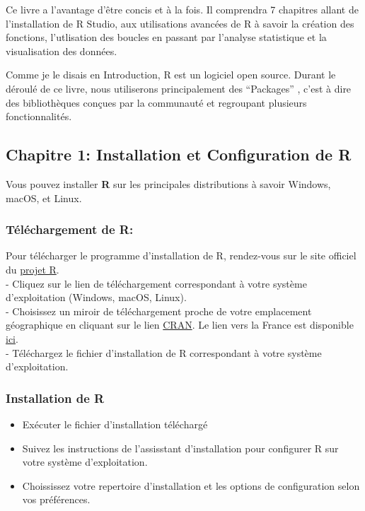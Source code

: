 \documentclass[
]{article}
\providecommand{\tightlist}{%
  \setlength{\itemsep}{0pt}\setlength{\parskip}{0pt}}
\begin{document}
Ce livre a l'avantage d'être concis et à la fois. Il comprendra 7
chapitres allant de l'installation de R Studio, aux utilisations
avancées de R à savoir la création des fonctions, l'utlisation des
boucles en passant par l'analyse statistique et la visualisation des
données.

Comme je le disais en Introduction, R est un logiciel open source.
Durant le déroulé de ce livre, nous utiliserons principalement des
``Packages'' , c'est à dire des bibliothèques conçues par la communauté
et regroupant plusieurs fonctionnalités.

\hypertarget{chapitre-1-installation-et-configuration-de-r}{%
\subsection{Chapitre 1: Installation et Configuration de
R}\label{chapitre-1-installation-et-configuration-de-r}}

Vous pouvez installer \textbf{R} sur les principales distributions à
savoir Windows, macOS, et Linux.

\hypertarget{tuxe9luxe9chargement-de-r}{%
\subsubsection{Téléchargement de R:}\label{tuxe9luxe9chargement-de-r}}

Pour télécharger le programme d'installation de R, rendez-vous sur le
site officiel du \href{https://www.r-project.org/}{projet R}.\\
- Cliquez sur le lien de téléchargement correspondant à votre système
d'exploitation (Windows, macOS, Linux).\\
- Choisissez un miroir de téléchargement proche de votre emplacement
géographique en cliquant sur le lien
\href{https://cran.r-project.org/mirrors.html}{CRAN}. Le lien vers la
France est disponible \href{https://pbil.univ-lyon1.fr/CRAN/}{ici}.\\
- Téléchargez le fichier d'installation de R correspondant à votre
système d'exploitation.

\hypertarget{installation-de-r}{%
\subsubsection{Installation de R}\label{installation-de-r}}

\begin{itemize}
\tightlist
\item
  Exécuter le fichier d'installation téléchargé\\
\item
  Suivez les instructions de l'assisstant d'installation pour configurer
  R sur votre système d'exploitation.\\
\item
  Choississez votre repertoire d'installation et les options de
  configuration selon vos préférences.
\end{itemize}
\end{document}
